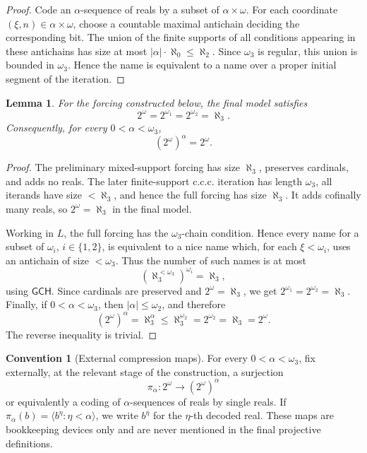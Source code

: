 \documentclass[11pt]{article}
\theoremstyle{plain}
\newtheorem{lemma}[theorem]{Lemma}
\theoremstyle{definition}
\newtheorem{convention}[theorem]{Convention}
\theoremstyle{remark}
\newcommand{\GCH}{\mathsf{GCH}}
\begin{document}
\begin{proof}
Code an $\alpha$-sequence of reals by a subset of $\alpha\times\omega$.  For each
coordinate $(\xi,n)\in\alpha\times\omega$, choose a countable maximal antichain
deciding the corresponding bit.  The union of the finite supports of all
conditions appearing in these antichains has size at most
$|\alpha|\cdot\aleph_0\leq\aleph_2$.  Since $\omega_3$ is regular, this union is
bounded in $\omega_3$.  Hence the name is equivalent to a name over a proper
initial segment of the iteration.
\end{proof}

\begin{lemma}\label{lem:final-cardarith}
For the forcing constructed below, the final model satisfies
\[
2^\omega=2^{\omega_1}=2^{\omega_2}=\aleph_3.
\]
Consequently, for every $0<\alpha<\omega_3$,
\[
(2^\omega)^\alpha=2^\omega.
\]
\end{lemma}

\begin{proof}
The preliminary mixed-support forcing has size $\aleph_3$, preserves cardinals,
and adds no reals.  The later finite-support c.c.c. iteration has length
$\omega_3$, all iterands have size $<\aleph_3$, and hence the full forcing has
size $\aleph_3$.  It adds cofinally many reals, so $2^\omega=\aleph_3$ in the
final model.

Working in $L$, the full forcing has the $\omega_3$-chain condition.  Hence every
name for a subset of $\omega_i$, $i\in\{1,2\}$, is equivalent to a nice name which,
for each $\xi<\omega_i$, uses an antichain of size $<\omega_3$.  Thus the number
of such names is at most
\[
(\aleph_3^{<\omega_3})^{\omega_i}=\aleph_3,
\]
using $\GCH$.  Since cardinals are preserved and $2^\omega=\aleph_3$, we get
$2^{\omega_1}=2^{\omega_2}=\aleph_3$.  Finally, if $0<\alpha<\omega_3$, then
$|\alpha|\leq\omega_2$, and therefore
\[
(2^\omega)^\alpha=\aleph_3^\alpha\leq \aleph_3^{\omega_2}=2^{\omega_2}=\aleph_3=2^\omega.
\]
The reverse inequality is trivial.
\end{proof}

\begin{convention}[External compression maps]\label{conv:compression-maps}
For every $0<\alpha<\omega_3$, fix externally, at the relevant stage of the
construction, a surjection
\[
\pi_\alpha:2^\omega\longrightarrow (2^\omega)^\alpha
\]
or equivalently a coding of $\alpha$-sequences of reals by single reals.  If
$\pi_\alpha(b)=\langle b^\eta:\eta<\alpha\rangle$, we write
$b^\eta$ for the $\eta$-th decoded real.  These maps are bookkeeping devices only
and are never mentioned in the final projective definitions.
\end{convention}
\end{document}
